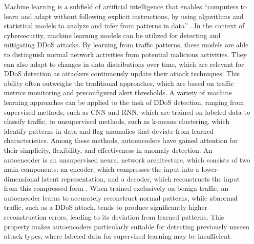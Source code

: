 Machine learning is a subfield of artificial intelligence that enables “computers to learn and adapt without following explicit instructions, by using algorithms and statistical models to analyze and infer from patterns in data” \citep{oed-machine-learning}. In the context of cybersecurity, machine learning models can be utilized for detecting and mitigating DDoS attacks. By learning from traffic patterns, these models are able to distinguish normal network activities from potential malicious activities. They can also adapt to changes in data distributions over time, which are relevant for DDoS detection as attackers continuously update their attack techniques. This ability often outweighs the traditional approaches, which are based on traffic metrics monitoring and preconfigured alert thresholds. A variety of machine learning approaches can be applied to the task of DDoS detection, ranging from supervised methods, such as CNN and RNN, which are trained on labeled data to classify traffic, to unsupervised methods, such as k-means clustering, which identify patterns in data and flag anomalies that deviate from learned characteristics. Among these methods, autoencoders have gained attention for their simplicity, flexibility, and effectiveness in anomaly detection. An autoencoder is an unsupervised neural network architecture, which consists of two main components: an encoder, which compresses the input into a lower-dimensional latent representation, and a decoder, which reconstructs the input from this compressed form \citep{8616075}. When trained exclusively on benign traffic, an autoencoder learns to accurately reconstruct normal patterns, while abnormal traffic, such as a DDoS attack, tends to produce significantly higher reconstruction errors, leading to its deviation from learned patterns. This property makes autoencoders particularly suitable for detecting previously unseen attack types, where labeled data for supervised learning may be insufficient.

